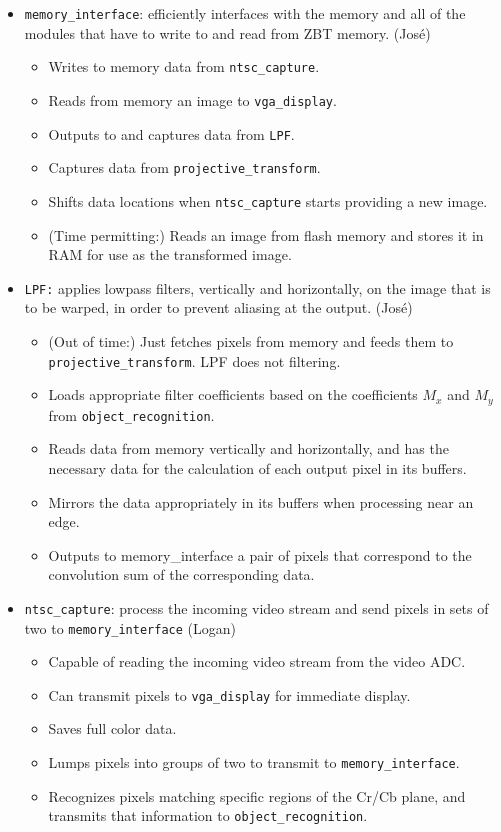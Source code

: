 \documentclass{article}
\begin{document}
\begin{itemize}
\item[] {\tt memory\_interface}: efficiently interfaces with the memory and all of the modules that have to write to and read from ZBT memory. (Jos\'{e})
	\begin{itemize}
	\item Writes to memory data from {\tt ntsc\_capture}.
	\item Reads from memory an image to {\tt vga\_display}.
	\item Outputs to and captures data from {\tt LPF}.
	\item Captures data from {\tt projective\_transform}.
	\item Shifts data locations when {\tt ntsc\_capture} starts providing a new image.
	\item (Time permitting:) Reads an image from flash memory and stores it in RAM for use as the transformed image.
	\end{itemize}

\item[] {\tt LPF:} applies lowpass filters, vertically and horizontally, on the image that is to be warped, in order to prevent aliasing at the output. (Jos\'{e})
	\begin{itemize}
	\item (Out of time:) Just fetches pixels from memory and feeds them to {\tt projective\_transform}. LPF does not filtering.
	\item Loads appropriate filter coefficients based on the coefficients $M_x$ and $M_y$ from {\tt object\_recognition}.
	\item Reads data from memory vertically and horizontally, and has the necessary data for the calculation of each output pixel in its buffers.
	\item Mirrors the data appropriately in its buffers when processing near an edge.
	\item Outputs to memory\_interface a pair of pixels that correspond to the convolution sum of the corresponding data.
	\end{itemize}

\item[] {\tt ntsc\_capture}: process the incoming video stream and send pixels in sets of two to {\tt memory\_interface} (Logan)
	\begin{itemize}
	\item Capable of reading the incoming video stream from the video ADC.
	\item Can transmit pixels to {\tt vga\_display} for immediate display.
	\item Saves full color data.
	\item Lumps pixels into groups of two to transmit to {\tt memory\_interface}.
	\item Recognizes pixels matching specific regions of the Cr/Cb plane, and transmits that information to {\tt object\_recognition}.
	\end{itemize}


\end{itemize}
\end{document}
